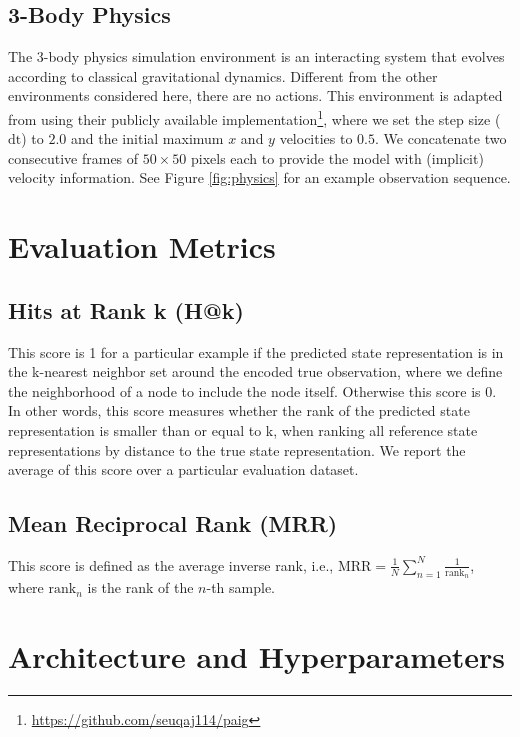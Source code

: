 \documentclass{article} %
\begin{document}
\subsection{3-Body Physics} The 3-body physics simulation environment is an interacting system that evolves according to classical gravitational dynamics. Different from the other environments considered here, there are no actions. This environment is adapted from \citet{jaques2019physics} using their publicly available implementation\footnote{\url{https://github.com/seuqaj114/paig}}, where we set the step size ($\mathrm{dt}$) to $2.0$ and the initial maximum $x$ and $y$ velocities to $0.5$. We concatenate two consecutive frames of $50\times50$ pixels each to provide the model with (implicit) velocity information.  See Figure \ref{fig:physics} for an example observation sequence.


\section{Evaluation Metrics}
\label{sec:metrics}

\subsection{Hits at Rank k (H@k)} This score is 1 for a particular example if the predicted state representation is in the k-nearest neighbor set around the encoded true observation, where we define the neighborhood of a node to include the node itself. Otherwise this score is 0. In other words, this score measures whether the rank of the predicted state representation is smaller than or equal to k, when ranking all reference state representations by distance to the true state representation. We report the average of this score over a particular evaluation dataset.

\subsection{Mean Reciprocal Rank (MRR)}
This score is defined as the average inverse rank, i.e., $\mathrm{MRR}=\frac{1}{N}\sum_{n=1}^N \frac{1}{\mathrm{rank}_n}$, where $\mathrm{rank}_n$ is the rank of the $n$-th sample.

\section{Architecture and Hyperparameters}
\label{sec:architecture}
\end{document}
